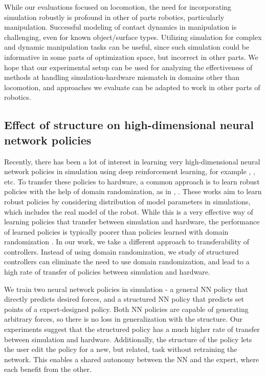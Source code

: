 While our evaluations focused on locomotion, the need for incorporating simulation robustly is profound in other of parts robotics, particularly manipulation. Successful modeling of contact dynamics in manipulation is challenging, even for known object/surface types. Utilizing simulation for complex and dynamic manipulation tasks can be useful, since such simulation could be informative in some parts of optimization space, but incorrect in other parts. 
We hope that our experimental setup can be used for analyzing the effectiveness of methods at handling simulation-hardware mismatch in domains other than locomotion, and approaches we evaluate can be adapted to work in other parts of robotics.



\subsection{Effect of structure on high-dimensional neural network policies}

Recently, there has been a lot of interest in learning very high-dimensional neural network policies in simulation using deep reinforcement learning, for example \cite{rajeswaran2017towards}, \cite{peng2017sim}, etc. To transfer these policies to hardware, a common approach is to learn robust policies with the help of domain randomization, as in \cite{mordatch2015ensemble}, \cite{tan2018sim}. These works aim to 
learn robust policies by considering distribution of model parameters in simulations, which includes the real model of the robot. While this is a very effective way of learning policies that transfer between simulation and hardware, the performance of learned policies is typically poorer than policies learned with domain randomization \citep{tan2018sim}. In our work, we take a different approach to transferability of controllers. Instead of using domain randomization, we study of structured controllers can eliminate the need to use domain randomization, and lead to a high rate of transfer of policies between simulation and hardware.

We train two neural network policies in simulation - a general NN policy that directly predicts desired forces, and a structured NN policy that predicts set points of a expert-designed policy. Both NN policies are capable of generating arbitrary forces, so there is no loss in generalization with the structure. Our experiments suggest that the structured policy has a much higher rate of transfer between simulation and hardware. Additionally, the structure of the policy lets the user edit the policy for a new, but related, task without retraining the network. This enables a shared autonomy between the NN and the expert, where each benefit from the other.

